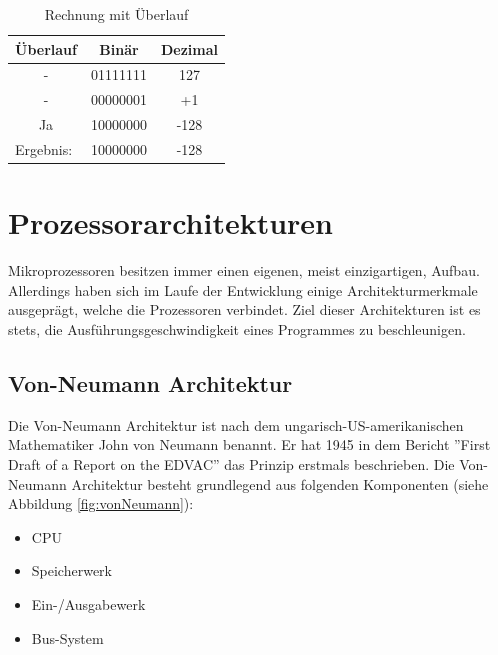 \documentclass[12pt]{article}
\begin{document}
\begin{table}[!htb]
\centering
\caption{Rechnung mit Überlauf}
\label{my-label}
\begin{tabular}{|c|c|c|}
\hline
\textbf{Überlauf}               & \multicolumn{1}{c|}{\textbf{Binär}} & \multicolumn{1}{c|}{\textbf{Dezimal}} \\ \hline
-                               & 01111111                            & 127                                   \\ \hline
-                               & 00000001                            & +1                                    \\ \hline
Ja                              & 10000000                            & -128                                  \\ \hline\hline
\multicolumn{1}{|l|}{Ergebnis:} & 10000000                            & -128                                  \\ \hline
\end{tabular}
\end{table}

\section{Prozessorarchitekturen}
Mikroprozessoren besitzen immer einen eigenen, meist einzigartigen, Aufbau. Allerdings haben sich im Laufe der Entwicklung einige Architekturmerkmale ausgeprägt, welche die Prozessoren verbindet. 
Ziel dieser Architekturen ist es stets, die Ausführungsgeschwindigkeit eines Programmes zu beschleunigen.
\subsection{Von-Neumann Architektur}
Die Von-Neumann Architektur ist nach dem ungarisch-US-amerikanischen Mathematiker John von Neumann benannt. Er hat 1945 in dem Bericht ''First Draft of a Report on the EDVAC'' das Prinzip erstmals beschrieben.
Die Von-Neumann Architektur besteht grundlegend aus folgenden Komponenten (siehe Abbildung \ref{fig:vonNeumann}):
\begin{itemize}
\item CPU 
\item Speicherwerk 
\item Ein-/Ausgabewerk
\item Bus-System
\end{itemize}
\end{document}
